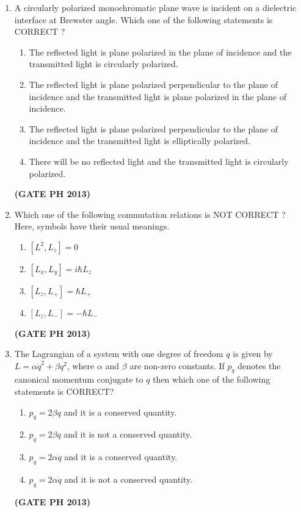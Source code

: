 \documentclass[14pt, a4paper]{extarticle}
\begin{document}
\begin{enumerate}[label=\textbf{Q. \arabic*}]
\item A circularly polarized monochromatic plane wave is incident on a dielectric interface at Brewster angle. Which one of the following statements is CORRECT ?
\begin{enumerate}
    \item The reflected light is plane polarized in the plane of incidence and the transmitted light is circularly polarized.
    \item The reflected light is plane polarized perpendicular to the plane of incidence and the transmitted light is plane polarized in the plane of incidence.
    \item The reflected light is plane polarized perpendicular to the plane of incidence and the transmitted light is elliptically polarized.
    \item There will be no reflected light and the transmitted light is circularly polarized.
\end{enumerate}
\hfill \textbf{(GATE PH 2013)}

\item Which one of the following commutation relations is NOT CORRECT ? Here, symbols have their usual meanings.
\begin{enumerate}
    \item $[L^2, L_z] = 0$
    \item $[L_x, L_y] = i\hbar L_z$
    \item $[L_z, L_+] = \hbar L_+$
    \item $[L_z, L_-] = -\hbar L_-$
\end{enumerate}
\hfill \textbf{(GATE PH 2013)}

\item The Lagrangian of a system with one degree of freedom $q$ is given by $L = \alpha \dot{q}^2 + \beta q^2$, where $\alpha$ and $\beta$ are non-zero constants. If $p_q$ denotes the canonical momentum conjugate to $q$ then which one of the following statements is CORRECT?
\begin{enumerate}
    \item $p_q = 2\beta q$ and it is a conserved quantity.
    \item $p_q = 2\beta q$ and it is not a conserved quantity.
    \item $p_q = 2\alpha\dot{q}$ and it is a conserved quantity.
    \item $p_q = 2\alpha\dot{q}$ and it is not a conserved quantity.
\end{enumerate}
\hfill \textbf{(GATE PH 2013)}


\end{enumerate}
\end{document}
